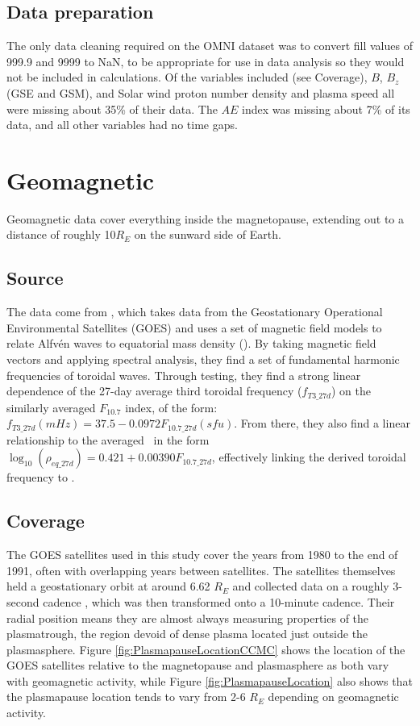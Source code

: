 \subsection{Data preparation}
The only data cleaning required on the OMNI dataset was to convert fill values of 999.9 and 9999 to NaN, to be appropriate for use in data analysis so they would not be included in calculations. Of the variables included (see Coverage), $B$, $B_z$ (GSE and GSM), and Solar wind proton number density and plasma speed all were missing about 35\% of their data. The $AE$ index was missing about 7\% of its data, and all other variables had no time gaps.

\section{Geomagnetic}
Geomagnetic data cover everything inside the magnetopause, extending out to a distance of roughly 10$R_E$ on the sunward side of Earth. 

\subsection{Source}
The data come from \cite{Takahashi2010SolarCycleVariation}, which takes data from the Geostationary Operational Environmental Satellites (GOES) and uses a set of magnetic field models to relate Alfvén waves to equatorial mass density (\req). By taking magnetic field vectors and applying spectral analysis, they find a set of fundamental harmonic frequencies of toroidal waves. Through testing, they find a strong linear dependence of the 27-day average third toroidal frequency ($f_{T3\_27d}$) on the similarly averaged $F_{10.7}$ index, of the form: $f_{T3\_27d}(mHz)=37.5-0.0972 F_{10.7\_27d}(sfu)$. From there, they also find a linear relationship to the averaged \req\ in the form $\log_{10}(\rho_{eq\_27d})=0.421+0.00390 F_{10.7\_27d}$, effectively linking the derived toroidal frequency to \req.

\subsection{Coverage}
\label{DataSparsity}
The GOES satellites used in this study cover the years from 1980 to the end of 1991, often with overlapping years between satellites. The satellites themselves held a geostationary orbit at around 6.62 $R_E$ and collected data on a roughly 3-second cadence \citep{GOESDataSource}, which was then transformed onto a 10-minute cadence. Their radial position means they are almost always measuring properties of the plasmatrough, the region devoid of dense plasma located just outside the plasmasphere. Figure \ref{fig:PlasmapauseLocationCCMC} shows the location of the GOES satellites relative to the magnetopause and plasmasphere as both vary with geomagnetic activity, while Figure \ref{fig:PlasmapauseLocation} also shows that the plasmapause location tends to vary from 2-6 $R_E$ depending on geomagnetic activity. 



